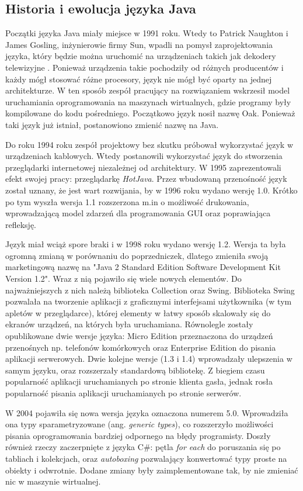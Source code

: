 \subsection{Historia i ewolucja języka Java}
Początki języka Java miały miejsce w 1991 roku. Wtedy to Patrick Naughton i James Gosling, inżynierowie firmy Sun,  wpadli na pomysł zaprojektowania języka, który będzie można uruchomić na urządzeniach takich jak dekodery telewizyjne \cite{java8}. Ponieważ urządzenia takie pochodziły od różnych producentów i każdy mógł stosować różne procesory, język nie mógł być oparty na jednej architekturze. W ten sposób zespół pracujący na rozwiązaniem wskrzesił model uruchamiania oprogramowania na maszynach wirtualnych, gdzie programy były kompilowane do kodu pośredniego.  
Początkowo język nosił nazwę Oak. Ponieważ taki język już istniał, postanowiono zmienić nazwę na Java.

Do roku 1994 roku zespół projektowy bez skutku próbował wykorzystać język w urządzeniach kablowych. Wtedy postanowili wykorzystać język do stworzenia przeglądarki internetowej niezależnej od architektury. W 1995 zaprezentowali efekt swojej pracy: przeglądarkę \textsl{HotJava}. Przez wbudowaną przenośność język został uznany, że jest wart rozwijania, by w 1996 roku wydano wersję 1.0. Krótko po tym wyszła wersja 1.1 rozszerzona m.in o możliwość drukowania, wprowadzającą model zdarzeń dla programowania GUI oraz poprawiająca refleksję.

Język miał wciąż spore braki i w 1998 roku wydano wersję 1.2. Wersja ta była ogromną zmianą w porównaniu do poprzedniczek, dlatego zmieniła swoją marketingową nazwę na "Java 2 Standard Edition Software Development Kit Version 1.2". Wraz z nią pojawiło się wiele nowych elementów. Do najważniejszych z nich należą biblioteka Collection oraz Swing. Biblioteka Swing pozwalała na tworzenie aplikacji z graficznymi interfejsami użytkownika (w tym apletów w przeglądarce), której elementy w łatwy sposób skalowały się do ekranów urządzeń, na których była uruchamiana. Równolegle zostały opublikowane dwie wersje języka: Micro Edition przeznaczona do urządzeń przenośnych np. telefonów komórkowych oraz Enterprise Edition do pisania aplikacji serwerowych. Dwie kolejne wersje (1.3 i 1.4) wprowadzały ulepszenia w samym języku, oraz rozszerzały standardową bibliotekę. Z biegiem czasu popularność aplikacji uruchamianych po stronie klienta gasła, jednak rosła popularność pisania aplikacji uruchamianych po stronie serwerów.

W 2004 pojawiła się nowa wersja języka oznaczona numerem 5.0. Wprowadziła ona typy sparametryzowane (ang. \textsl{generic types}), co rozszerzyło możliwości pisania oprogramowania bardziej odpornego na błędy programisty. Doszły również rzeczy zaczerpnięte z języka C\#: pętla \textsl{for each} do poruszania się po tabliach i kolekcjach, oraz \textsl{autoboxing} pozwalający konwertować typy proste na obiekty i odwrotnie. Dodane zmiany były zaimplementowane tak, by nie zmieniać nic w maszynie wirtualnej.

